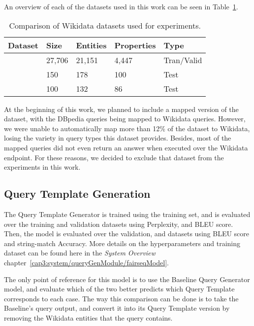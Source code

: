 An overview of each of the datasets used in this work can be seen in Table~\ref{table:datasetsOverview}.

\begin{table}[h!]
    \centering
    \begin{tabular}{|l|l|l|l|l|}
    \hline
    \textbf{Dataset} & \textbf{Size} & \textbf{Entities} & \textbf{Properties} & \textbf{Type} \\ \hline
    \LCQuADtwo{}        & 27,706        & 21,151            & 4,447               & Tran/Valid    \\ \hline
    \QALDseven{}           & 150           & 178               & 100                 & Test          \\ \hline
    \WikiSPARQL{}       & 100           & 132               & 86                  & Test          \\ \hline
    \end{tabular}
    \caption{Comparison of Wikidata datasets used for experiments.}
    \label{table:datasetsOverview}
\end{table}

At the beginning of this work, we planned to include a mapped version of the 
\DBNQA{}~\cite{dataset:dbnqa-hartmann-marx-soru-2018} dataset, 
with the DBpedia queries being mapped to Wikidata queries. However, we were unable 
to automatically map more than 12\% of the dataset to Wikidata, losing the variety in query 
types this dataset provides. Besides, most of the mapped queries did not even return an 
answer when executed over the Wikidata endpoint. For these reasons, we decided 
to exclude that dataset from the experiments in this work.


\subsection{Query Template Generation}
\label{cap4:experimentalDesign/queryTemplateGeneration}
The Query Template Generator is trained using the \LCQuADtwo{} training set, and is 
evaluated over the training and validation datasets using Perplexity, and BLEU score. 
Then, the model is evaluated over the \LCQuADtwo{} validation, \QALDseven{} and 
\WikiSPARQL{} datasets using BLEU score and string-match Accuracy. More details on the 
hyperparameters and training dataset can be found here in the \textit{System Overview} 
chapter~\ref{cap3:system/queryGenModule/fairseqModel}.

The only point of reference for this model is to use the Baseline Query Generator model, and 
evaluate which of the two better predicts which Query Template corresponds to each case. 
The way this comparison can be done is to take the Baseline's \SPARQL{} query output, and convert it 
into its Query Template version by removing the Wikidata entities that the query contains.

